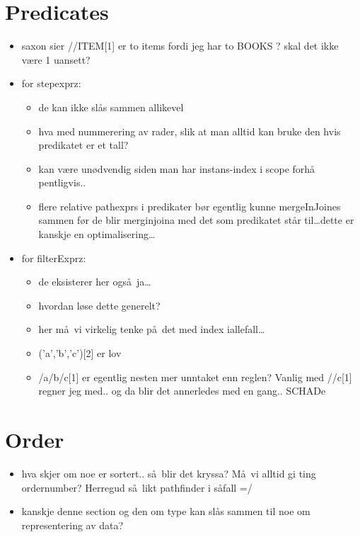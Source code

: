 \section{Predicates}
\label{sect:discussion:predicates}
\begin{itemize}
  \item saxon sier //ITEM[1] er to items fordi jeg har to BOOKS ? skal det ikke
  v\ae re 1 uansett?
  \item for stepexprz: 

	\begin{itemize}
	  \item de kan ikke sl\aa s sammen allikevel
	  \item hva med nummerering av rader, slik at man alltid kan bruke den hvis
	  predikatet er et tall?
	  \item kan v\ae re un\o dvendig siden man har instans-index i scope forh\aa
	  pentligvis..
	  \item flere relative pathexprs i predikater b\o r egentlig kunne mergeInJoines sammen f\o r de blir merginjoina
	  med det som predikatet st\aa r til\ldots dette er kanskje en optimalisering\ldots
    \end{itemize}
  \item for filterExprz:
  	\begin{itemize}
	  \item de eksisterer her ogs\aa~ja\ldots
	  \item hvordan l\o se dette generelt?
	  \item her m\aa~vi virkelig tenke p\aa~det med index iallefall\ldots 
	  \item ('a','b','c')[2] er lov
	  \item /a/b/c[1] er egentlig nesten mer unntaket enn reglen? Vanlig med
	  //c[1] regner jeg med.. og da blir det annerledes med en gang.. SCHADe
    \end{itemize} 
\end{itemize}

\section{Order}
\label{sect:discussion:order}
\begin{itemize}
  \item hva skjer om noe er sortert.. s\aa~blir det kryssa? M\aa~vi alltid gi ting ordernumber? Herregud s\aa~likt
  pathfinder i s\aa fall =/
  \item kanskje denne section og den om type kan sl\aa s sammen til noe om representering av data?
\end{itemize}

